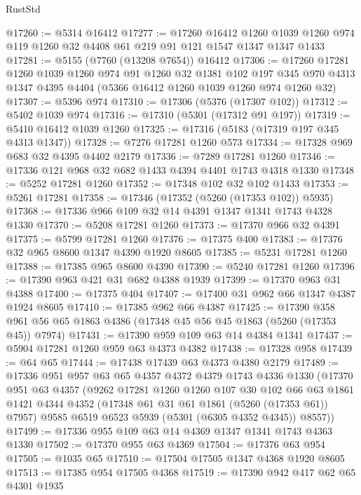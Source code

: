 \begin{lexlean}{RustStd}
\begin{coremodule}
@17260 := @5314 @16412
@17277 := @17260
    @16412
    @1260
    @1039
    @1260
    @974
    @119
    @1260
    @32
    @4408
    @61
    @219
    @91
    @121
    @1547
    @1347
    @1347
    @1433
@17281 := @5155 (@7760 (@13208 @7654)) @16412
@17306 := @17260
    @17281
    @1260
    @1039
    @1260
    @974
    @91
    @1260
    @32
    @1381
    @102
    @197
    @345
    @970
    @4313
    @1347
    @4395
    @4404
    (@5366 @16412 @1260 @1039 @1260 @974 @1260 @32)
@17307 := @5396 @974
@17310 := @17306 (@5376 (@17307 @102))
@17312 := @5402 @1039 @974
@17316 := @17310 (@5301 (@17312 @91 @197))
@17319 := @5410 @16412 @1039 @1260
@17325 := @17316 (@5183 (@17319 @197 @345 @4313 @1347))
@17328 := @7276 @17281 @1260 @573
@17334 := @17328 @969 @683 @32 @4395 @4402 @2179
@17336 := @7289 @17281 @1260
@17346 := @17336 @121 @968 @32 @682 @1433 @4394 @4401 @1743 @4318 @1330
@17348 := @5252 @17281 @1260
@17352 := @17348 @102 @32 @102 @1433
@17353 := @5261 @17281
@17358 := @17346 (@17352 (@5260 (@17353 @102)) @5935)
@17368 := @17336 @966 @109 @32 @14 @4391 @1347 @1341 @1743 @4328 @1330
@17370 := @5208 @17281 @1260
@17373 := @17370 @966 @32 @4391
@17375 := @5799 @17281 @1260
@17376 := @17375 @400
@17383 := @17376 @32 @965 @8600 @1347 @4390 @1920 @8605
@17385 := @5231 @17281 @1260
@17388 := @17385 @965 @8600 @4390
@17390 := @5240 @17281 @1260
@17396 := @17390 @963 @421 @31 @682 @4388 @1939
@17399 := @17370 @963 @31 @4388
@17400 := @17375 @404
@17407 := @17400 @31 @962 @66 @1347 @4387 @1924 @8605
@17410 := @17385 @962 @66 @4387
@17425 := @17390 @358 @961 @56 @65 @1863 @4386 (@17348 @45 @56 @45 @1863 (@5260 (@17353 @45)) @7974)
@17431 := @17390 @959 @109 @63 @14 @4384 @1341
@17437 := @5904 @17281 @1260 @959 @63 @4373 @4382
@17438 := @17328 @958
@17439 := @64 @65
@17444 := @17438 @17439 @63 @4373 @4380 @2179
@17489 := @17336
    @951
    @957
    @63
    @65
    @4357
    @4372
    @4379
    @1743
    @4336
    @1330
    (@17370
      @951
      @63
      @4357
      (@9262
        @17281
        @1260
        @1260
        @107
        @30
        @102
        @66
        @63
        @1861
        @1421
        @4344
        @4352
        (@17348 @61 @31 @61 @1861 (@5260 (@17353 @61)) @7957)
        @9585
        @6519
        @6523
        @5939
        (@5301 (@6305 @4352 @4345))
        @8557))
@17499 := @17336 @955 @109 @63 @14 @4369 @1347 @1341 @1743 @4363 @1330
@17502 := @17370 @955 @63 @4369
@17504 := @17376 @63 @954
@17505 := @1035 @65
@17510 := @17504 @17505 @1347 @4368 @1920 @8605
@17513 := @17385 @954 @17505 @4368
@17519 := @17390 @942 @417 @62 @65 @4301 @1935

\end{coremodule}
\end{lexlean}
